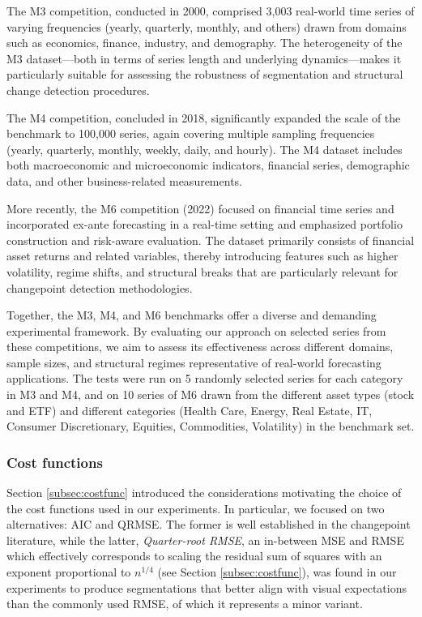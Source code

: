 \documentclass[preprints,article,submit,pdftex,moreauthors]{Definitions/mdpi}
\begin{document}
The M3 competition, conducted in 2000, comprised 3,003 real-world time series of varying frequencies (yearly, quarterly, monthly, and others) drawn from domains such as economics, finance, industry, and demography. The heterogeneity of the M3 dataset—both in terms of series length and underlying dynamics—makes it particularly suitable for assessing the robustness of segmentation and structural change detection procedures.

The M4 competition, concluded in 2018, significantly expanded the scale of the benchmark to 100,000 series, again covering multiple sampling frequencies (yearly, quarterly, monthly, weekly, daily, and hourly). The M4 dataset includes both macroeconomic and microeconomic indicators, financial series, demographic data, and other business-related measurements. 

More recently, the M6 competition (2022) focused on financial time series and incorporated ex-ante forecasting in a real-time setting and emphasized portfolio construction and risk-aware evaluation. The dataset primarily consists of financial asset returns and related variables, thereby introducing features such as higher volatility, regime shifts, and structural breaks that are particularly relevant for changepoint detection methodologies.

Together, the M3, M4, and M6 benchmarks offer a diverse and demanding experimental framework. By evaluating our approach on selected series from these competitions, we aim to assess its effectiveness across different domains, sample sizes, and structural regimes representative of real-world forecasting applications. The tests were run on 5 randomly selected series for each category in M3 and M4, and on 10 series of M6 drawn from the different asset types (stock and ETF) and different categories (Health Care, Energy, Real Estate, IT, Consumer Discretionary, Equities, Commodities, Volatility) in the benchmark set.

\subsubsection{Cost functions}

Section \ref{subsec:costfunc} introduced the considerations motivating the choice of the cost functions used in our experiments. In particular, we focused on two alternatives: AIC and QRMSE. The former is well established in the changepoint literature, while the latter, {\it Quarter-root RMSE}, an in-between MSE and RMSE which effectively corresponds to scaling the residual sum of squares with an exponent proportional to $n^{1/4}$ (see Section \ref{subsec:costfunc}), was found in our experiments to produce segmentations that better align with visual expectations than the commonly used RMSE, of which it represents a minor variant. 
\end{document}
